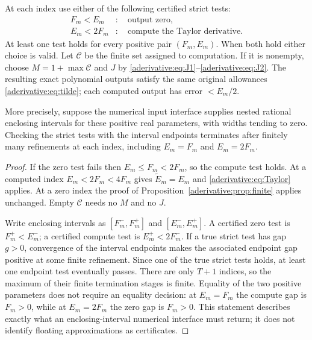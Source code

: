 \begin{aderivativeproposition}\label{aderivative:prop:overlap}
At each index use either of the following certified strict tests:
\begin{align}
F_m<E_m&:\quad\text{output zero},\label{aderivative:eq:zerotest}\\
E_m<2F_m&:\quad\text{compute the Taylor derivative}.
\label{aderivative:eq:computetest}
\end{align}
At least one test holds for every positive pair $(F_m,E_m)$.
When both hold either choice is valid. Let $\mathcal C$ be
the finite set assigned to computation. If it is nonempty,
choose $M=1+\max\mathcal C$ and $J$ by
\eqref{aderivative:eq:J1}--\eqref{aderivative:eq:J2}. The resulting exact polynomial
outputs satisfy the same original allowances
\eqref{aderivative:eq:tilde}; each computed output has error $<E_m/2$.

More precisely, suppose the numerical input interface supplies
nested rational enclosing intervals for these positive real
parameters, with widths tending to zero. Checking the strict
tests with the interval endpoints terminates after finitely
many refinements at each index, including $E_m=F_m$ and
$E_m=2F_m$.
\end{aderivativeproposition}
\begin{proof}
If the zero test fails then $E_m\le F_m<2F_m$, so the compute
test holds. At a computed index $E_m<2F_m<4F_m$ gives
$\widetilde E_m=E_m$ and \eqref{aderivative:eq:Taylor} applies.
At a zero index the proof of Proposition~\ref{aderivative:prop:finite}
applies unchanged. Empty $\mathcal C$ needs no $M$ and no $J$.

Write enclosing intervals as $[F_m^-,F_m^+]$ and
$[E_m^-,E_m^+]$. A certified zero test is $F_m^+<E_m^-$;
a certified compute test is $E_m^+<2F_m^-$. If a true
strict test has gap $g>0$, convergence of the interval
endpoints makes the associated endpoint gap positive at
some finite refinement. Since one of the true strict
tests holds, at least one endpoint test eventually passes.
There are only $T+1$ indices, so the maximum of their finite
termination stages is finite. Equality of the two positive
parameters does not require an equality decision: at
$E_m=F_m$ the compute gap is $F_m>0$, while at $E_m=2F_m$
the zero gap is $F_m>0$. This statement describes exactly
what an enclosing-interval numerical interface must return;
it does not identify floating approximations as certificates.
\end{proof}

